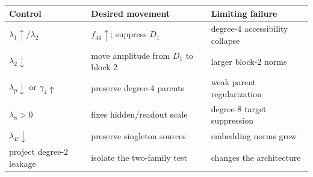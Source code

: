 \documentclass[10pt]{article}
\begin{document}
\begin{center}
\begin{tabular}{@{}lll@{}}
\toprule
Control & Desired movement & Limiting failure \\
\midrule
$\lambda_1\!\uparrow/\lambda_2$ & $f_{44}\uparrow$; suppress $D_1$ & degree-4 accessibility collapse \\
$\lambda_2\!\downarrow$ & move amplitude from $D_1$ to block 2 & larger block-2 norms \\
$\lambda_p\!\downarrow$ or $\gamma_4\!\uparrow$ & preserve degree-4 parents & weak parent regularization \\
$\lambda_8>0$ & fixes hidden/readout scale & degree-8 target suppression \\
$\lambda_E\!\downarrow$ & preserve singleton sources & embedding norms grow \\
project degree-2 leakage & isolate the two-family test & changes the architecture \\
\bottomrule
\end{tabular}
\end{center}
\end{document}
